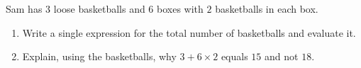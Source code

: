 Sam has $3$ loose basketballs and $6$ boxes with $2$ basketballs in each box.
\begin{enumerate}
\item[(a)] Write a single expression for the total number of basketballs and evaluate it.
\item[(b)] Explain, using the basketballs, why $3+6\times2$ equals $15$ and not $18$.
\end{enumerate}
